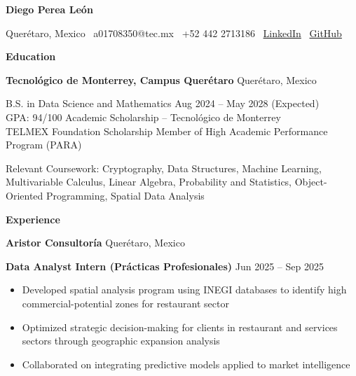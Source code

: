 \documentclass[11pt]{article}
\begin{document}
\begin{center}
    \textbf{Diego Perea León}\\
    \hrulefill
\end{center}

\begin{center}
    Querétaro, Mexico \textbullet \ a01708350@tec.mx \textbullet \ +52 442 2713186 \textbullet \ \href{https://www.linkedin.com/in/diego-perea-le%C3%B3n-bbba81335/}{LinkedIn} \textbullet \ \href{https://github.com/Perea094}{GitHub}
\end{center}

\vspace{0.5pt}

\begin{center}
    \textbf{Education}
\end{center}
\textbf{Tecnológico de Monterrey, Campus Querétaro} \hfill Querétaro, Mexico

B.S. in Data Science and Mathematics \hfill Aug 2024 – May 2028 (Expected)\\
GPA: 94/100 \hfill Academic Scholarship – Tecnológico de Monterrey\\
TELMEX Foundation Scholarship \hfill Member of High Academic Performance Program (PARA)

Relevant Coursework: Cryptography, Data Structures, Machine Learning, Multivariable Calculus, Linear Algebra, Probability and Statistics, Object-Oriented Programming, Spatial Data Analysis

\vspace{12pt}

\begin{center}
    \textbf{Experience}
\end{center}
\textbf{Aristor Consultoría} \hfill Querétaro, Mexico

\textbf{Data Analyst Intern (Prácticas Profesionales)} \hfill Jun 2025 – Sep 2025
\begin{itemize}[noitemsep, topsep=0pt, partopsep=0pt, parsep=0pt]
    \item Developed spatial analysis program using INEGI databases to identify high commercial-potential zones for restaurant sector
    \item Optimized strategic decision-making for clients in restaurant and services sectors through geographic expansion analysis
    \item Collaborated on integrating predictive models applied to market intelligence
\end{itemize}
\end{document}
